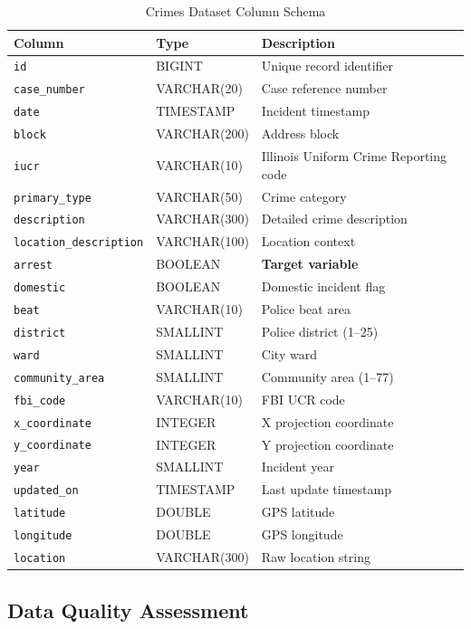 \begin{table}[H]
\centering
\caption{Crimes Dataset Column Schema}
\label{tab:schema}
\begin{tabularx}{\textwidth}{llX}
\toprule
\textbf{Column} & \textbf{Type} & \textbf{Description} \\
\midrule
\texttt{id} & BIGINT & Unique record identifier \\
\texttt{case\_number} & VARCHAR(20) & Case reference number \\
\texttt{date} & TIMESTAMP & Incident timestamp \\
\texttt{block} & VARCHAR(200) & Address block \\
\texttt{iucr} & VARCHAR(10) & Illinois Uniform Crime Reporting code \\
\texttt{primary\_type} & VARCHAR(50) & Crime category \\
\texttt{description} & VARCHAR(300) & Detailed crime description \\
\texttt{location\_description} & VARCHAR(100) & Location context \\
\texttt{arrest} & BOOLEAN & \textbf{Target variable} \\
\texttt{domestic} & BOOLEAN & Domestic incident flag \\
\texttt{beat} & VARCHAR(10) & Police beat area \\
\texttt{district} & SMALLINT & Police district (1--25) \\
\texttt{ward} & SMALLINT & City ward \\
\texttt{community\_area} & SMALLINT & Community area (1--77) \\
\texttt{fbi\_code} & VARCHAR(10) & FBI UCR code \\
\texttt{x\_coordinate} & INTEGER & X projection coordinate \\
\texttt{y\_coordinate} & INTEGER & Y projection coordinate \\
\texttt{year} & SMALLINT & Incident year \\
\texttt{updated\_on} & TIMESTAMP & Last update timestamp \\
\texttt{latitude} & DOUBLE & GPS latitude \\
\texttt{longitude} & DOUBLE & GPS longitude \\
\texttt{location} & VARCHAR(300) & Raw location string \\
\bottomrule
\end{tabularx}
\end{table}

\subsection{Data Quality Assessment}

